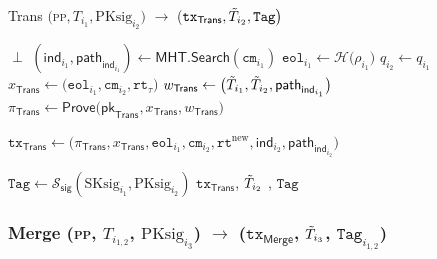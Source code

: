 \begin{algorithm}[h]
\caption{\textsf{Trans} $\big($\textsc{pp}$, T_{i_1},  \text{PKsig}_{i_2} \big)$ $\rightarrow$ \big($\texttt{tx}_{\textsf{Trans}}, \Tilde{T}_{i_2}, \texttt{Tag}\big)$}\label{alg:trans}
\begin{algorithmic}[1]
 {}
\State \Return $\perp$
\EndIf
\State $(\mathsf{ind}_{i_1}, \mathsf{path}_{\mathsf{ind}_{i_1}}) \gets \mathsf{MHT}.\mathsf{Search}(\texttt{cm}_{i_1})$
\State $\texttt{eol}_{i_1} \gets \mathcal{H} \big( \rho_{i_1}\big)$
\State $q_{i_2} \gets q_{i_1}$
\State $x_\textsf{Trans} \gets \big(\texttt{eol}_{i_1}, \texttt{cm}_{i_2}, \texttt{rt}_\tau \big)$
\State $w_\textsf{Trans} \gets \big( \Tilde{T}_{i_1}, \Tilde{T}_{i_2}, \mathsf{path}_{\mathsf{ind}_{i_1}}\big)$
\State $\pi_{\textsf{Trans}} \gets \textsf{Prove}\big(\mathsf{pk}_{\textsf{Trans}}, x_{\textsf{Trans}}, w_{\textsf{Trans}}\big)$

\State$\texttt{tx}_{\textsf{Trans}} \gets \big(\pi_{\textsf{Trans}}, x_{\textsf{Trans}}, \texttt{eol}_{i_1}, \texttt{cm}_{i_2}, \texttt{rt}^{\text{new}}, \mathsf{ind}_{i_2}, \mathsf{path}_{\mathsf{ind}_{i_2}} \big)$

\State $\texttt{Tag} \leftarrow \mathcal{S}_\mathsf{sig}(\text{SKsig}_{i_1}, \text{PKsig}_{i_2})$
\State \Return $\texttt{tx}_{\textsf{Trans}}$, $\Tilde{T}_{i_2}$ , $\texttt{Tag}$
\end{algorithmic}
\end{algorithm}

\newpage

\subsubsection{\textsf{Merge} (\textsc{pp}, $T_{i_{1,2}}$,  $\text{PKsig}_{i_3}$) $\rightarrow$ ($\texttt{tx}_{\textsf{Merge}}$, $\Tilde{T}_{i_3}$, $\texttt{Tag}_{i_{1,2}}$)}

